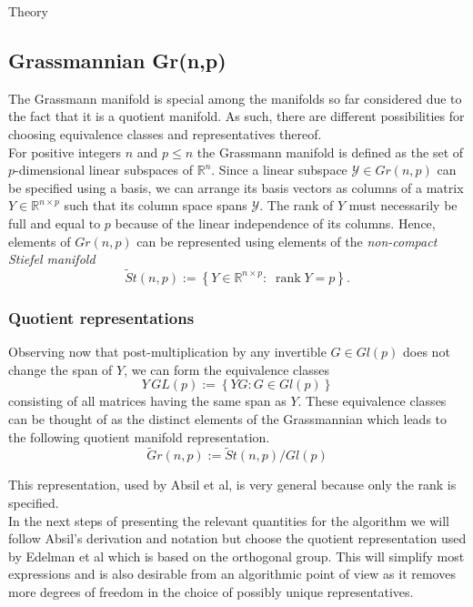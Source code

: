 \begin{chapter}{Theory}
\subsection{Grassmannian Gr(n,p)} %
\label{sub:Grassmanian}
The Grassmann manifold is special among the manifolds so far considered due to the fact that it is a quotient manifold. 
As such, there are different possibilities for choosing equivalence classes and representatives thereof.\\

For positive integers $n$ and $p\leq n$ the Grassmann manifold is defined as the set of $p$-dimensional linear subspaces of $\mathbb{R}^n$. 
Since a linear subspace $\mathcal{Y}\in Gr(n,p)$ can be specified using a basis, we can arrange its basis vectors as columns of
a matrix $Y\in\mathbb{R}^{n\times p}$ such that its column space spans $\mathcal{Y}$. The rank of $Y$ must necessarily be full and equal to $p$ because of the linear independence
of its columns. Hence, elements of $Gr(n,p)$ can be represented using elements of the \emph{non-compact Stiefel manifold}
\begin{equation}
    \tilde St(n,p) := \left\lbrace Y\in\mathbb{R}^{n\times p}:\; \operatorname{rank}Y=p\right\rbrace.
\end{equation}

\subsubsection{Quotient representations} %
\label{ssub:Quotient representations}
Observing now that post-multiplication by any invertible $G\in Gl(p)$ does not change the span of $Y$, we can form the equivalence classes
\begin{equation}
    Y\,GL(p) := \left\lbrace YG: G\in Gl(p)\right\rbrace
\end{equation}
consisting of all matrices having the same span as $Y$. These equivalence classes can be thought of as the distinct elements of the Grassmannian which
leads to the following quotient manifold representation.\\
\begin{equation}
    \tilde Gr(n,p):=\tilde St(n,p) / Gl(p)
\end{equation}

This representation, used by Absil et al\cite{AbsilGrassmann}, is very general because only the rank is specified.\\

In the next steps of presenting the relevant quantities for the
algorithm we will follow Absil's derivation and notation but choose the quotient representation used by Edelman et al \cite{EAS} which is based on the orthogonal group. This will simplify most expressions and is also desirable from an algorithmic point of view as it removes more degrees of freedom in the choice of possibly unique representatives.\\


\end{chapter}
